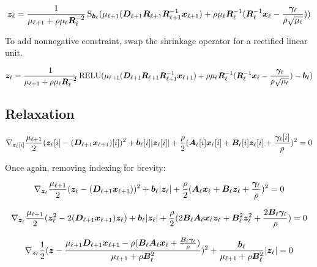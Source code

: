 \begin{equation}
\bm{z}_{\ell} = \frac{1}{\mu_{\ell + 1} + \rho\mu_{\ell}\bm{R}_{\ell}^{-2}}\operatorname{S}_{\bm{b}_{\ell}}(\mu_{\ell + 1}(\bm{D}_{\ell + 1}\bm{R}_{\ell + 1}\bm{R}_{\ell + 1}^{-1}\bm{x}_{\ell + 1}) + \rho\mu_{\ell}\bm{R}_{\ell}^{-1}(\bm{R}_{\ell}^{-1}\bm{x}_{\ell} - \frac{\bm{\gamma}_{\ell}}{\rho\sqrt{\mu_{\ell}}}))
\end{equation}

To add nonnegative constraint, swap the shrinkage operator for a rectified linear unit.

\begin{equation}
\bm{z}_{\ell} = \frac{1}{\mu_{\ell + 1} + \rho\mu_{\ell}\bm{R}_{\ell}^{-2}}\operatorname{RELU}(\mu_{\ell + 1}(\bm{D}_{\ell + 1}\bm{R}_{\ell + 1}\bm{R}_{\ell + 1}^{-1}\bm{x}_{\ell + 1}) + \rho\mu_{\ell}\bm{R}_{\ell}^{-1}(\bm{R}_{\ell}^{-1}\bm{x}_{\ell} - \frac{\bm{\gamma}_{\ell}}{\rho\sqrt{\mu_{\ell}}}) - \bm{b}_{\ell})
\end{equation}

\subsection{Relaxation}
\begin{equation}
\nabla_{\bm{z}_{\ell}[i]} \frac{\mu_{\ell + 1}}{2}(\bm{z}_{\ell}[i] - (\bm{D}_{\ell + 1}\bm{x}_{\ell + 1})[i])^2 + \bm{b}_{\ell}[i]|\bm{z}_{\ell}[i]| + \frac{\rho}{2} (\bm{A}_{\ell}[i]\bm{x}_{\ell}[i] + \bm{B}_{\ell}[i]\bm{z}_{\ell}[i] + \frac{\bm{\gamma}_{\ell}[i]}{\rho})^2 = 0
\end{equation}

Once again, removing indexing for brevity:

\begin{equation}
\nabla_{\bm{z}_{\ell}} \frac{\mu_{\ell + 1}}{2}(\bm{z}_{\ell} - (\bm{D}_{\ell + 1}\bm{x}_{\ell + 1}))^2 + \bm{b}_{\ell}|\bm{z}_{\ell}| + \frac{\rho}{2} (\bm{A}_{\ell}\bm{x}_{\ell} + \bm{B}_{\ell}\bm{z}_{\ell} + \frac{\bm{\gamma}_{\ell}}{\rho})^2 = 0
\end{equation}

\begin{equation}
\nabla_{\bm{z}_{\ell}} \frac{\mu_{\ell + 1}}{2}(\bm{z}_{\ell}^2 - 2(\bm{D}_{\ell + 1}\bm{x}_{\ell + 1})\bm{z}_{\ell}) + \bm{b}_{\ell}|\bm{z}_{\ell}| + \frac{\rho}{2} (2\bm{B}_{\ell}\bm{A}_{\ell}\bm{x}_{\ell}\bm{z}_{\ell} + \bm{B}_{\ell}^2\bm{z}_{\ell}^2 + \frac{2\bm{B}_{\ell}\bm{\gamma}_{\ell}}{\rho}) = 0
\end{equation}

\begin{equation}
\nabla_{\bm{z}_{\ell}} \frac{1}{2}(\bm{z} -\frac{\mu_{\ell + 1}\bm{D}_{\ell + 1}\bm{x}_{\ell + 1} - \rho(\bm{B}_{\ell}\bm{A}_{\ell}\bm{x}_{\ell} + \frac{\bm{B}_{\ell}\bm{\gamma}_{\ell}}{\rho})}{\mu_{\ell + 1} + \rho\bm{B}_{\ell}^2})^2 + \frac{\bm{b}_{\ell}}{\mu_{\ell + 1} + \rho\bm{B}_{\ell}^2}|\bm{z}_{\ell}| = 0
\end{equation}

